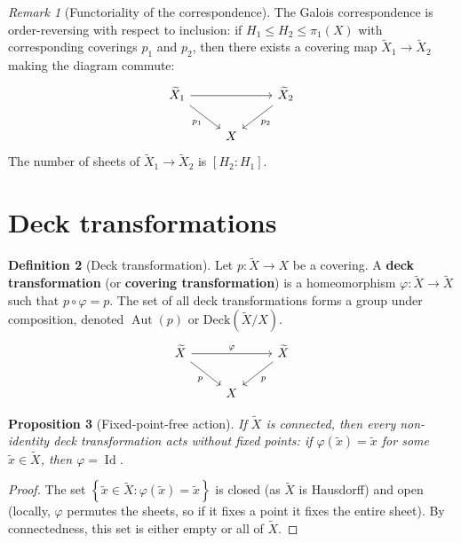 \documentclass[12pt,a4paper,openany]{book}
\theoremstyle{definition}
\newtheorem{definition}{Definition}[chapter]
\theoremstyle{plain}
\newtheorem{proposition}[definition]{Proposition}
\theoremstyle{remark}
\newtheorem{remark}[definition]{Remark}
\DeclareMathOperator{\Aut}{Aut}
\DeclareMathOperator{\Id}{Id}
\newcommand{\set}[1]{\left\{#1\right\}}
\begin{document}
\begin{remark}[Functoriality of the correspondence]\label{rem:galois-functor}
  The Galois correspondence is order-reversing with respect to inclusion:
  if $H_1 \leq H_2 \leq \pi_1(X)$ with corresponding coverings $p_1$ and
  $p_2$, then there exists a covering map $\widetilde{X}_1 \to \widetilde{X}_2$
  making the diagram commute:
  \[
    \begin{tikzcd}
      \widetilde{X}_1 \ar[rr] \ar[dr,"p_1"'] & & \widetilde{X}_2 \ar[dl,"p_2"] \\
      & X &
    \end{tikzcd}
  \]
  The number of sheets of $\widetilde{X}_1 \to \widetilde{X}_2$ is $[H_2 : H_1]$.
\end{remark}

\section{Deck transformations}\label{sec:deck-transformations}

\begin{definition}[Deck transformation]\label{def:deck-transformation}
  Let $p\colon \widetilde{X} \to X$ be a covering.  A
  \textbf{deck transformation} (or \textbf{covering transformation}) is a
  homeomorphism $\varphi\colon \widetilde{X} \to \widetilde{X}$ such that
  $p \circ \varphi = p$.  The set of all deck transformations forms a group
  under composition, denoted $\Aut(p)$ or $\mathrm{Deck}(\widetilde{X}/X)$.
  \[
    \begin{tikzcd}
      \widetilde{X} \ar[rr,"\varphi"] \ar[dr,"p"'] & & \widetilde{X} \ar[dl,"p"] \\
      & X &
    \end{tikzcd}
  \]
\end{definition}

\begin{proposition}[Fixed-point-free action]\label{prop:deck-free}
  If $\widetilde{X}$ is connected, then every non-identity deck transformation
  acts without fixed points: if $\varphi(\tilde{x}) = \tilde{x}$ for some
  $\tilde{x} \in \widetilde{X}$, then $\varphi = \Id$.
\end{proposition}

\begin{proof}
  The set $\set{\tilde{x} \in \widetilde{X} : \varphi(\tilde{x}) = \tilde{x}}$
  is closed (as $\widetilde{X}$ is Hausdorff) and open (locally, $\varphi$
  permutes the sheets, so if it fixes a point it fixes the entire sheet).
  By connectedness, this set is either empty or all of $\widetilde{X}$.
\end{proof}
\end{document}

